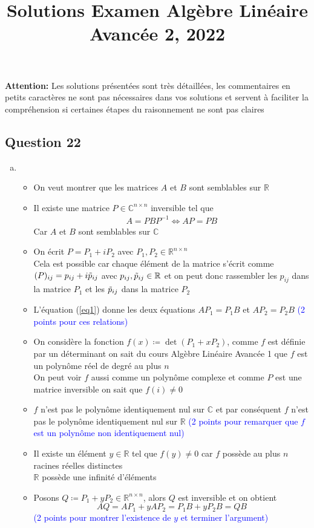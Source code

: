 \documentclass[11pt, a4paper, oneside]{article}
\newcommand{\indice}[1]{{\scriptsize \color{RubineRed} {#1}}}
\begin{document}
\title{Solutions Examen Algèbre Linéaire Avancée 2, 2022}
\maketitle

\noindent
\textbf{Attention:} Les solutions présentées sont très détaillées, les commentaires en \indice{ petits caractères} ne sont pas  nécessaires dans vos solutions et servent à faciliter la compréhension si certaines étapes du raisonnement ne sont pas claires

\subsection*{Question 22}
\begin{enumerate}[a)]
\item
\begin{itemize}
\item On veut montrer que les matrices $A$ et $B$ sont semblables sur $\mathbb{R}$
\item Il existe une matrice $P \in \mathbb{C}^{n \times n}$ inversible tel que
\begin{align}
\label{eq1}
A = PBP^{-1} \Longleftrightarrow AP = PB
\end{align}
\indice{Car $A$ et $B$ sont semblables sur $\mathbb{C}$}
\item On écrit $P=P_1 + i P_2$ avec $P_1,P_2 \in \mathbb{R}^{n \times n}$ \\
\indice{Cela est possible car chaque élément de la matrice s'écrit comme $(P)_{ij} = p_{ij} + i\Tilde{p}_{ij}$ avec $p_{ij},\Tilde{p}_{ij} \in \mathbb{R}$ et on peut donc rassembler les $p_{ij}$ dans la matrice $P_1$ et les $\Tilde{p}_{ij}$ dans la matrice $P_2$}
\item L'équation (\ref{eq1}) donne les deux équations $AP_1=P_1B$ et $AP_2=P_2B$ \textcolor{blue}{(2 points pour ces relations)}
\item On considère la fonction $f(x) \coloneqq \det(P_1 + xP_2)$, comme $f$ est définie par un déterminant on sait du cours Algèbre Linéaire Avancée 1 que $f$ est un polynôme réel de degré au plus $n$ \\
\indice{On peut voir $f$ aussi comme un polynôme complexe et comme $P$ est une matrice inversible on sait que $f(i) \neq 0$}
\item $f$ n'est pas le polynôme identiquement nul sur $\mathbb{C}$ et par conséquent $f$ n'est pas le polynôme identiquement nul sur $\mathbb{R}$ \textcolor{blue}{(2 points pour remarquer que $f$ est un polynôme non identiquement nul)}
\item Il existe un élément $y \in \mathbb{R}$ tel que $f(y) \neq 0$ car $f$ possède au plus $n$ racines réelles distinctes \\
\indice{$\mathbb{R}$ possède une infinité d'éléments}
\item Posons $Q \coloneqq P_1 + yP_2 \in \mathbb{R}^{n \times n}$, alors $Q$ est inversible et on obtient
$$AQ = AP_1 + yAP_2 = P_1B + yP_2B = QB$$ 
\textcolor{blue}{(2 points pour montrer l'existence de $y$ et terminer l'argument)}
\end{itemize}


\end{enumerate}
\end{document}
